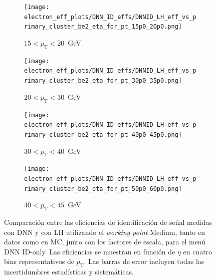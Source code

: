 \begin{figure}[h]
  \centering

  \begin{subfigure}[b]{0.48\textwidth}
    \centering
    \texttt{[image: electron\_eff\_plots/DNN\_ID\_effs/DNNID\_LH\_eff\_vs\_primary\_cluster\_be2\_eta\_for\_pt\_15p0\_20p0.png]}
    \caption{$15 < p_{\mathrm{T}} < 20$~GeV}
    \label{res:eff_dnn_lh_ptbin1}
  \end{subfigure}
  \hfill
  \begin{subfigure}[b]{0.48\textwidth}
    \centering
    \texttt{[image: electron\_eff\_plots/DNN\_ID\_effs/DNNID\_LH\_eff\_vs\_primary\_cluster\_be2\_eta\_for\_pt\_30p0\_35p0.png]}
    \caption{$20 < p_{\mathrm{T}} < 30$~GeV}
    \label{res:eff_dnn_lh_ptbin2}
  \end{subfigure}

  \vspace{0.5cm}

  \begin{subfigure}[b]{0.48\textwidth}
    \centering
    \texttt{[image: electron\_eff\_plots/DNN\_ID\_effs/DNNID\_LH\_eff\_vs\_primary\_cluster\_be2\_eta\_for\_pt\_40p0\_45p0.png]}
    \caption{$30 < p_{\mathrm{T}} < 40$~GeV}
    \label{res:eff_dnn_lh_ptbin3}
  \end{subfigure}
  \hfill
  \begin{subfigure}[b]{0.48\textwidth}
    \centering
    \texttt{[image: electron\_eff\_plots/DNN\_ID\_effs/DNNID\_LH\_eff\_vs\_primary\_cluster\_be2\_eta\_for\_pt\_50p0\_60p0.png]}
    \caption{$40 < p_{\mathrm{T}} < 45$~GeV}
    \label{res:eff_dnn_lh_ptbin4}
  \end{subfigure}

  \caption{
    Comparación entre las eficiencias de identificación de señal medidas con DNN y con LH utilizando el \textit{working point} Medium, 
    tanto en datos como en MC, junto con los factores de escala, para el menú DNN ID-only. 
    Las eficiencias se muestran en función de $\eta$ en cuatro bins representativos de $p_{\mathrm{T}}$. 
    Las barras de error incluyen todas las incertidumbres estadísticas y sistemáticas.}
  \label{res:eff_sfs_dnn_vs_lh_eta_4ptbins}
\end{figure}



